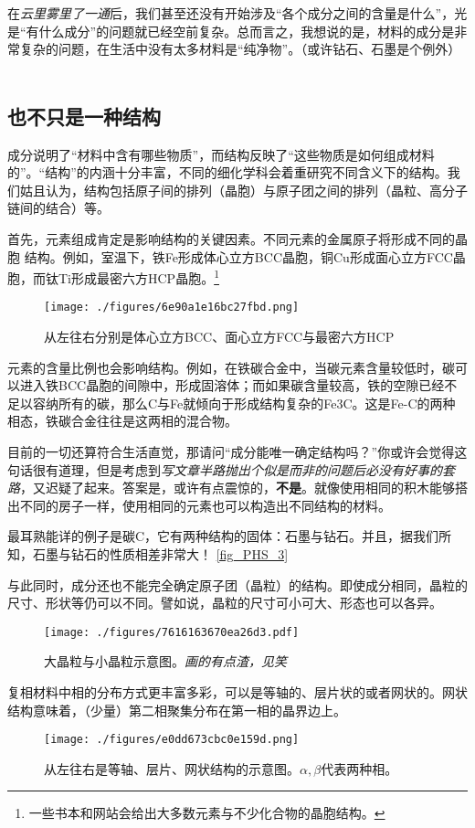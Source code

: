 在\textsl{云里雾里了一通}后，我们甚至还没有开始涉及“各个成分之间的含量是什么”，光是“有什么成分”的问题就已经空前复杂。总而言之，我想说的是，材料的成分是非常复杂的问题，在生活中没有太多材料是“纯净物”。（或许钻石、石墨是个例外）
 
\subsection{也不只是一种结构}
成分说明了“材料中含有哪些物质”，而结构反映了“这些物质是如何组成材料的”。“结构”的内涵十分丰富，不同的细化学科会着重研究不同含义下的结构。我们姑且认为，结构包括原子间的排列（晶胞）与原子团之间的排列（晶粒、高分子链间的结合）等。

首先，元素组成肯定是影响结构的关键因素。不同元素的金属原子将形成不同的晶胞 结构。例如，室温下，铁Fe形成体心立方BCC晶胞，铜Cu形成面心立方FCC晶胞，而钛Ti形成最密六方HCP晶胞。\footnote{一些书本和网站会给出大多数元素与不少化合物的晶胞结构。}
\begin{figure}[ht]
\centering
\texttt{[image: ./figures/6e90a1e16bc27fbd.png]}
\caption{从左往右分别是体心立方BCC、面心立方FCC与最密六方HCP} \label{fig_MSEINT_1}
\end{figure}
元素的含量比例也会影响结构。例如，在铁碳合金中，当碳元素含量较低时，碳可以进入铁BCC晶胞的间隙中，形成固溶体；而如果碳含量较高，铁的空隙已经不足以容纳所有的碳，那么C与Fe就倾向于形成结构复杂的Fe3C。这是Fe-C的两种相态，铁碳合金往往是这两相的混合物。

目前的一切还算符合生活直觉，那请问“成分能唯一确定结构吗？”你或许会觉得这句话很有道理，但是考虑到\textsl{写文章半路抛出个似是而非的问题后必没有好事的套路}，又迟疑了起来。答案是，或许有点震惊的，\textbf{不是}。就像使用相同的积木能够搭出不同的房子一样，使用相同的元素也可以构造出不同结构的材料。

最耳熟能详的例子是碳C，它有两种结构的固体：石墨与钻石。并且，据我们所知，石墨与钻石的性质相差非常大！
\autoref{fig_PHS_3}~

与此同时，成分还也不能完全确定原子团（晶粒）的结构。即使成分相同，晶粒的尺寸、形状等仍可以不同。譬如说，晶粒的尺寸可小可大、形态也可以各异。
\begin{figure}[ht]
\centering
\texttt{[image: ./figures/7616163670ea26d3.pdf]}
\caption{大晶粒与小晶粒示意图。\textsl{画的有点渣，见笑}} \label{fig_MSEINT_2}
\end{figure}

复相材料中相的分布方式更丰富多彩，可以是等轴的、层片状的或者网状的。网状结构意味着，（少量）第二相聚集分布在第一相的晶界边上。
\begin{figure}[ht]
\centering
\texttt{[image: ./figures/e0dd673cbc0e159d.png]}
\caption{从左往右是等轴、层片、网状结构的示意图。$\alpha, \beta$代表两种相。} \label{fig_MSEINT_3}
\end{figure}

